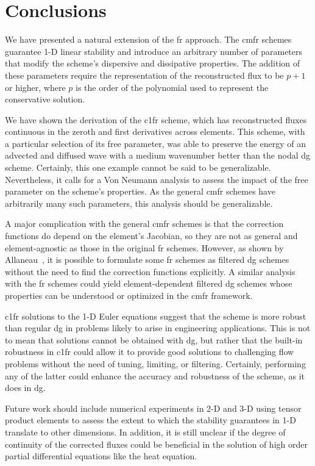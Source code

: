 \section{Conclusions}

We have presented a natural extension of the \gls{fr} approach. The \gls{cmfr} schemes guarantee 1-D linear stability and introduce an arbitrary number of parameters that modify the scheme's dispersive and dissipative properties. The addition of these parameters require the representation of the reconstructed flux to be $p+1$ or higher, where $p$ is the order of the polynomial used to represent the conservative solution.

 We have shown the derivation of the \gls{c1fr} scheme, which has reconstructed fluxes continuous in the zeroth and first derivatives across elements. This scheme, with a particular selection of its free parameter, was able to preserve the energy of an advected and diffused wave with a medium wavenumber better than the nodal \gls{dg} scheme. Certainly, this one example cannot be said to be generalizable. Nevertheless, it calls for a Von Neumann analysis to assess the impact of the free parameter on the scheme's properties. As the general \gls{cmfr} schemes have arbitrarily many such parameters, this analysis should be generalizable.

A major complication with the general \gls{cmfr} schemes is that the correction functions do depend on the element's Jacobian, so they are not as general and element-agnostic as those in the original \gls{fr} schemes. However, as shown by Allaneau~\cite{allaneau2011connections}, it is possible to formulate some \gls{fr} schemes as filtered \gls{dg} schemes without the need to find the correction functions explicitly. A similar analysis with the \gls{fr} schemes could yield element-dependent filtered \gls{dg} schemes whose properties can be understood or optimized in the \gls{cmfr} framework.

\gls{c1fr} solutions to the 1-D Euler equations suggest that the scheme is more robust than regular \gls{dg} in problems likely to arise in engineering applications. This is not to mean that solutions cannot be obtained with \gls{dg}, but rather that the built-in robustness in \gls{c1fr} could allow it to provide good solutions to challenging flow problems without the need of tuning, limiting, or filtering. Certainly, performing any of the latter could enhance the accuracy and robustness of the scheme, as it does in \gls{dg}.

Future work should include numerical experiments in 2-D and 3-D using tensor product elements to assess the extent to which the stability guarantees in 1-D translate to other dimensions. In addition, it is still unclear if the degree of continuity of the corrected fluxes could be beneficial in the solution of high order partial differential equations like the heat equation.